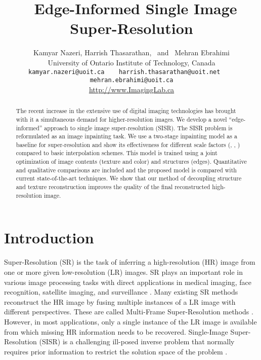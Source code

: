 \documentclass[10pt,twocolumn,letterpaper]{article}
\begin{document}
\title{\ Edge-Informed Single Image Super-Resolution}

\author{Kamyar Nazeri, Harrish Thasarathan, ~and~ Mehran Ebrahimi\\
University of Ontario Institute of Technology, Canada\\
{\tt\small {kamyar.nazeri@uoit.ca~~~ harrish.thasarathan@uoit.net  ~~~  mehran.ebrahimi}@uoit.ca}\\
\small{\url{http://www.ImagingLab.ca}}
}

\maketitle
\ificcvfinal\thispagestyle{empty}\fi

\begin{abstract}

The recent increase in the extensive use of digital imaging technologies has brought with it a simultaneous demand for higher-resolution images. We develop a novel ``edge-informed'' approach to single image super-resolution (SISR).  The SISR problem is reformulated as an image inpainting task. We use a two-stage inpainting model as a baseline for super-resolution and show its effectiveness for different scale factors (, , ) compared to basic interpolation schemes. This model is trained using a joint optimization of image contents (texture and color) and structures (edges). Quantitative and qualitative comparisons are included and the proposed model is compared with current state-of-the-art techniques. We show that our method of decoupling structure and texture reconstruction improves the quality of the final reconstructed high-resolution image.
\end{abstract}

\section{Introduction}

Super-Resolution (SR) is the task of inferring a high-resolution (HR) image from one or more given low-resolution (LR) images. SR plays an important role in various image processing tasks with direct applications in medical imaging, face recognition, satellite imaging, and surveillance \cite{farsiu2004advances}. Many existing SR methods reconstruct the HR image by fusing multiple instances of a LR image with different perspectives. These are called Multi-Frame Super-Resolution methods \cite{farsiu2004fast}. However, in most applications, only a single instance of the LR image is available from which missing HR information needs to be recovered.  Single-Image Super-Resolution (SISR) is a challenging ill-posed inverse problem \cite{ebrahimi2007solving} that normally requires prior information  to restrict the solution space of the problem \cite{shi2016real}.
\end{document}
